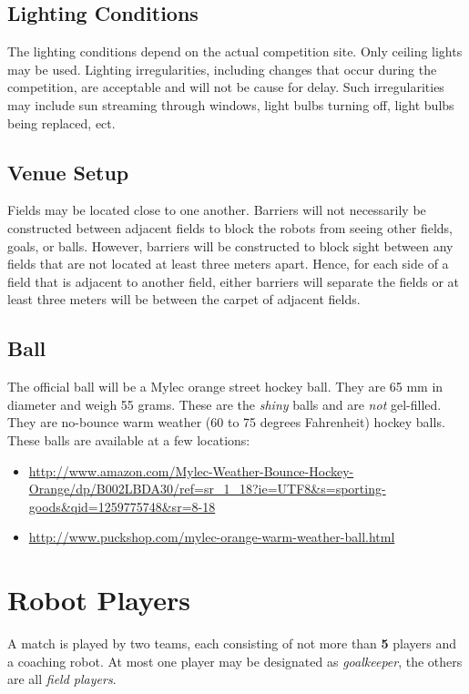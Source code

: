 \documentclass[12pt]{article}
\begin{document}
\subsection{Lighting Conditions}
\label{sec:lightConditions}
The lighting conditions depend on the actual competition site. Only ceiling lights may be used.  Lighting irregularities, including changes that occur during the competition, are acceptable and will not be cause for delay.  Such irregularities may include sun streaming through windows, light bulbs turning off, light bulbs being replaced, ect.

\subsection{Venue Setup}
\label{sec:boundaries}
Fields may be located close to one another.  Barriers will not necessarily be constructed between adjacent fields to block the robots from seeing other fields, goals, or balls.  However, barriers will be constructed to block sight between any fields that are not located at least three meters apart.  Hence, for each side of a field that is adjacent to another field, either barriers will separate the fields or at least three meters will be between the carpet of adjacent fields.

\subsection{Ball}
\label{sec:ball}

The official ball will be a Mylec orange street hockey ball. They are 65 mm in diameter and weigh 55 grams. These are the \emph{shiny} balls and are \emph{not} gel-filled.  They are no-bounce warm weather (60 to 75 degrees Fahrenheit) hockey balls.  These balls are available at a few locations:
\begin{itemize}
\item \url{http://www.amazon.com/Mylec-Weather-Bounce-Hockey-Orange/dp/B002LBDA30/ref=sr\_1\_18?ie=UTF8\&s=sporting-goods\&qid=1259775748\&sr=8-18}
\item \url{http://www.puckshop.com/mylec-orange-warm-weather-ball.html}
\end{itemize}


\newpage


\section{Robot Players}
\label{sec:robot_players}
A match is played by two teams, each consisting of not more than \textbf{5} players and a coaching robot. At most one player may be designated as \emph{goalkeeper}, the others are all \emph{field players}.
\end{document}
